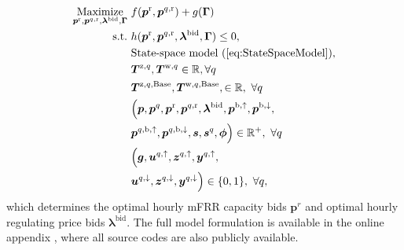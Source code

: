 \documentclass[conference]{IEEEtran}
\begin{document}
\begin{subequations}\label{P1:compact_model_mfrr}
    \begin{align}
        \underset{\bm{p}^{\rm{r}}, \bm{p}^{q,\rm{r}}, \bm{\lambda}^{\rm{bid}}, \bm{\Gamma}}{\text{Maximize}} \  & f(\bm{p}^{\rm{r}}, \bm{p}^{q,\rm{r}}) + g(\bm{\Gamma}) \label{P1:eq1_mfrr}
        \\
        \text{s.t.} \                                                                                           & h(\bm{p}^{\rm{r}}, \bm{p}^{q,\rm{r}}, \bm{\lambda}^{\rm{bid}}, \bm{\Gamma}) \leq 0, \label{P1:eq2_mfrr}                                              \\
        \                                                                                                       & \text{State-space model } (\ref{eq:StateSpaceModel}),  \label{P1:eq3_mfrr}
        \\
        \                                                                                                       & \bm{T}^{\text{z},q}, \bm{T}^{\text{w},q} \in \mathbb{R}, \forall{q} \label{P1:eq4_mfrr}
        \\
        \                                                                                                       & \bm{T}^{\text{z},q,\text{Base}}, \bm{T}^{\text{w},q,\text{Base}}, \in \mathbb{R}, \ \forall{q} \label{P1:eq5_mfrr}
        \\
        \                                                                                                       & \Bigl( \bm{p}, \bm{p}^{q}, \bm{p}^{\rm{r}}, \bm{p}^{q,\rm{r}}, \bm{\lambda}^{\rm{bid}}, \bm{p}^{\rm{b},\uparrow}, \bm{p}^{\rm{b},\downarrow}, \notag \\ & \bm{p}^{q,\rm{b},\uparrow}, \bm{p}^{q,\rm{b},\downarrow}, \bm{s}, \bm{s}^{q}, \bm{\phi} \Bigr) \in \mathbb{R}^{+}, \ \forall{q}  \label{P1:eq6_mfrr}
        \\
        \                                                                                                       & \Bigl( \bm{g}, \bm{u}^{q,\uparrow}, \bm{z}^{q,\uparrow}, \bm{y}^{q,\uparrow}, \notag                                                                 \\ & \bm{u}^{q,\downarrow}, \bm{z}^{q,\downarrow}, \bm{y}^{q,\downarrow} \Bigr) \in \{0,1\}, \ \forall{q}, \label{P1:eq7_mfrr}
    \end{align}
\end{subequations}
which determines the optimal hourly mFRR capacity bids $\bm{p}^{r}$ and optimal hourly regulating price bids $\bm{\lambda}^{\text{bid}}$. The full model formulation is available in the online appendix \cite{code}, where all source codes are also publicly available.
\end{document}
